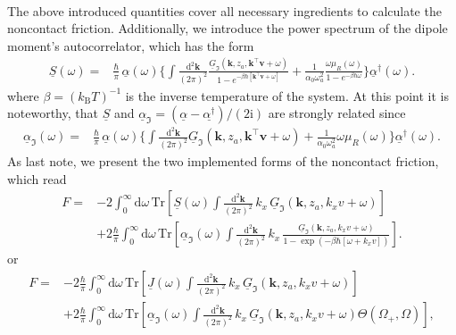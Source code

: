 \documentclass[11pt]{article}
\newcommand{\ii}[0]{\mathrm{i}}
\begin{document}
\\
The above introduced quantities cover all necessary ingredients to calculate the noncontact friction. Additionally, we introduce the power spectrum of the dipole moment's autocorrelator, which has the form
%
%
\begin{align}
\underline{S}(\omega)
=&\frac{\hbar}{\pi}\,
\underline{\alpha}(\omega)\Bigg\lbrace\int \frac{\mathrm{d}^2\mathbf{k}}{(2\pi)^2}
\frac{\underline{G}_\Im(\mathbf{k},z_a,\mathbf{k}^\intercal \mathbf{v} + \omega)}{1-e^{-\beta\hbar[\mathbf{k}^\intercal \mathbf{v} + \omega]}}
+\frac{1}{\alpha_0\omega_a^2}
\frac{\omega \mu_R(\omega)}{1-e^{-\beta\hbar\omega}}
\Bigg\rbrace \underline{\alpha}^\dagger(\omega)
%
\label{eq:powerspec}.
\end{align}
where $\beta= (k_\mathrm{B}T)^{-1}$ is the inverse temperature of the system. At this point it is noteworthy, that $\underline{S}$ and $\underline{\alpha}_\Im=(\underline{\alpha}-\underline{\alpha^\dagger})/(2\ii)$ are strongly related since
\begin{align}
\underline{\alpha}_\Im(\omega)
=&\frac{\hbar}{\pi}\,
\underline{\alpha}(\omega)\Bigg\lbrace\int \frac{\mathrm{d}^2\mathbf{k}}{(2\pi)^2}
\underline{G}_\Im(\mathbf{k},z_a,\mathbf{k}^\intercal \mathbf{v} + \omega)
+\frac{1}{\alpha_0\omega_a^2}
\omega \mu_R(\omega)
\Bigg\rbrace \underline{\alpha}^\dagger(\omega)
%
\label{eq:powerspec}.
\end{align}
As last note, we present the two implemented forms of the noncontact friction, which read
\begin{align}
\label{eq:numInt1}
F =&
-2
\int_{0}^{\infty} \mathrm{d}\omega\,
\mathrm{Tr}\left[
\underline{S}(\omega) \int\frac{\mathrm{d}^2\mathbf{k}}{(2\pi)^2} \, k_x\,\underline{G}_\Im(\mathbf{k}, z_a, k_xv+\omega)
\right]
\nonumber\\
&+
2\frac{\hbar}{\pi}
\int_{0}^{\infty} \mathrm{d}\omega\,
\mathrm{Tr}\left[
\underline{\alpha}_\Im(\omega)
\int\frac{\mathrm{d}^2\mathbf{k}}{(2\pi)^2} \, k_x\,
\frac{
\underline{G}_\Im(\mathbf{k}, z_a, k_xv+\omega)}{1-\exp(-\beta\hbar[\omega+k_xv])}
\right].
\end{align}
or
\begin{align}
\label{eq:numInt2}
F =&
-2
\frac{\hbar}{\pi}\int_{0}^{\infty} \mathrm{d}\omega\,
\mathrm{Tr}\left[
\underline{J}(\omega) \int\frac{\mathrm{d}^2\mathbf{k}}{(2\pi)^2} \, k_x\,\underline{G}_\Im(\mathbf{k}, z_a, k_xv+\omega)
\right]
\nonumber\\
&+
2\frac{\hbar}{\pi}
\int_{0}^{\infty} \mathrm{d}\omega\,
\mathrm{Tr}\left[
\underline{\alpha}_\Im(\omega)
\int\frac{\mathrm{d}^2\mathbf{k}}{(2\pi)^2} \, k_x\,
\underline{G}_\Im(\mathbf{k}, z_a, k_xv+\omega)\Theta(\Omega_+,\Omega)
\right],
\end{align}
\end{document}
